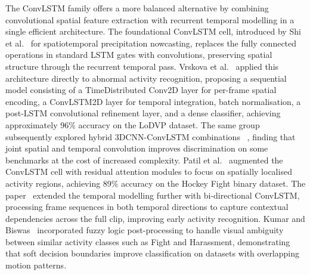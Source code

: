 \documentclass[11pt,a4paper]{article}
\begin{document}
	The ConvLSTM family offers a more balanced alternative by combining convolutional spatial
	feature extraction with recurrent temporal modelling in a single efficient architecture. 
	The foundational ConvLSTM cell, introduced by Shi et al.~\cite{xingjian2015convlstm} for 
	spatiotemporal precipitation nowcasting, replaces the fully connected operations in 
	standard LSTM gates with convolutions, preserving spatial structure through the recurrent
	temporal pass. Vrskova et al.~\cite{vrskova2022} applied this architecture directly to 
	abnormal activity recognition, proposing a sequential model consisting of a 
	TimeDistributed Conv2D layer for per-frame spatial encoding, a ConvLSTM2D layer for 
	temporal integration, batch normalisation, a post-LSTM convolutional refinement layer, 
	and a dense classifier, achieving approximately 96\% accuracy on the LoDVP dataset. The 
	same group subsequently explored hybrid 3DCNN-ConvLSTM combinations
	~\cite{vrskova2023_3dcnn_convlstm}, finding that joint spatial and temporal convolution
	improves discrimination on some benchmarks at the cost of increased complexity. Patil et 
	al.~\cite{residual_attention_convlstm2023} augmented the ConvLSTM cell with residual
	attention modules to focus on spatially localised activity regions, achieving 89\% 
	accuracy on the Hockey Fight binary dataset. The paper~\cite{bidirectional_convlstm2025}
	extended the temporal modelling further with bi-directional ConvLSTM, processing frame
	sequences in both temporal directions to capture contextual dependencies across the full
	clip, improving early activity recognition. Kumar and Biswas~\cite{kumar2024fuzzy}
	incorporated fuzzy logic post-processing to handle visual ambiguity between similar
	activity classes such as Fight and Harassment, demonstrating that soft decision
	boundaries improve classification on datasets with overlapping motion patterns.
\end{document}
